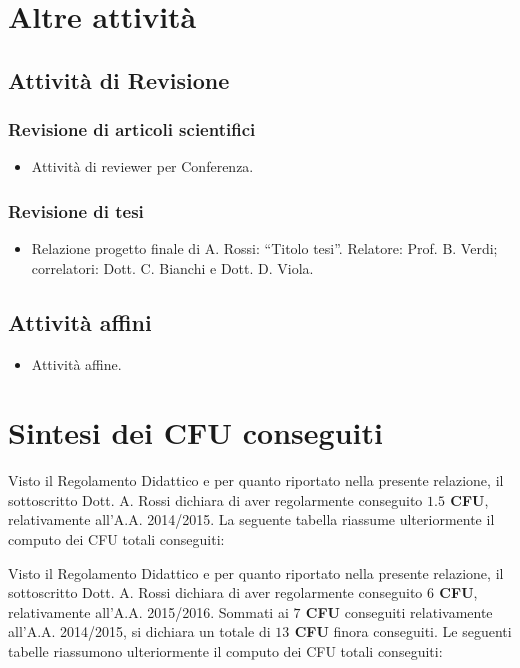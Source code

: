 \documentclass[a4paper,12pt]{article}
\begin{document}
\section{Altre attivit\`{a}}
\subsection{Attivit\`{a} di Revisione}
\subsubsection{Revisione di articoli scientifici}
\begin{itemize}
  \item Attività di reviewer per Conferenza.
\end{itemize}

\subsubsection{Revisione di tesi}
\begin{itemize}
  \item Relazione progetto finale di A. Rossi: ``Titolo tesi''. Relatore: Prof. B. Verdi; correlatori: Dott. C. Bianchi e Dott. D. Viola.
\end{itemize}

\subsection{Attivit\`{a} affini}
\begin{itemize}
    \item Attivit\`{a} affine.
\end{itemize}


\section{Sintesi dei CFU conseguiti}
Visto il Regolamento Didattico \cite{regolamento} e per quanto riportato nella presente relazione, il sottoscritto Dott. A. Rossi dichiara di aver regolarmente conseguito \textbf{$1.5$ CFU}, relativamente all'A.A. 2014/2015. La seguente tabella riassume ulteriormente il computo dei CFU totali conseguiti:


Visto il Regolamento Didattico \cite{regolamento} e per quanto riportato nella presente relazione, il sottoscritto Dott. A. Rossi dichiara di aver regolarmente conseguito \textbf{$6$ CFU}, relativamente all'A.A. 2015/2016. Sommati ai \textbf{$7$ CFU} conseguiti relativamente all'A.A. 2014/2015, si dichiara un totale di \textbf{$13$ CFU} finora conseguiti. Le seguenti tabelle riassumono ulteriormente il computo dei CFU totali conseguiti:
\end{document}
